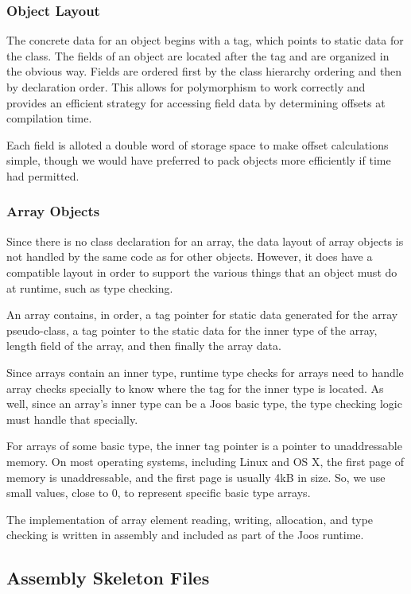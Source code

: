 \documentclass[pdftex,11pt,a4paper]{article}
\begin{document}
\subsubsection{Object Layout}

The concrete data for an object begins with a tag, which points to
static data for the class. The fields of an object are located after
the tag and are organized in the obvious way. Fields are ordered first
by the class hierarchy ordering and then by declaration order. This
allows for polymorphism to work correctly and provides an efficient
strategy for accessing field data by determining offsets at
compilation time.

Each field is alloted a double word of storage space to make offset
calculations simple, though we would have preferred to pack objects
more efficiently if time had permitted.

\subsubsection{Array Objects}

Since there is no class declaration for an array, the data layout of
array objects is not handled by the same code as for other
objects. However, it does have a compatible layout in order to support
the various things that an object must do at runtime, such as type
checking.

An array contains, in order, a tag pointer for static data generated for the
array pseudo-class, a tag pointer to the static data for the inner
type of the array, length field of the array, and then finally the
array data.

Since arrays contain an inner type, runtime type checks for arrays
need to handle array checks specially to know where the tag for the
inner type is located. As well, since an array's inner type can be a
Joos basic type, the type checking logic must handle that specially.

For arrays of some basic type, the inner tag pointer is a pointer to
unaddressable memory. On most operating systems, including Linux and
OS X, the first page of memory is unaddressable, and the first page is
usually 4kB in size. So, we use small values, close to 0, to represent
specific basic type arrays.

The implementation of array element reading, writing, allocation, and
type checking is written in assembly and included as part of the Joos
runtime.

\subsection{Assembly Skeleton Files}
\end{document}
